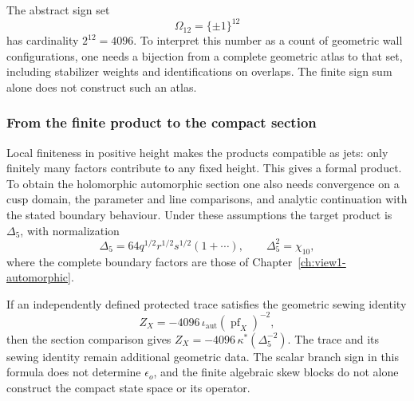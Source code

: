 The abstract sign set
\[
 \Omega_{12}=\{\pm1\}^{12}
\]
has cardinality \(2^{12}=4096\).  To interpret
this number as a count of geometric wall configurations, one needs
a bijection from a complete geometric atlas to that set, including
stabilizer weights and identifications on overlaps.  The finite
sign sum alone does not construct such an atlas.

\subsubsection*{From the finite product to the compact section}

Local finiteness in positive height makes the products compatible
as jets: only finitely many factors contribute to any fixed height.
This gives a formal product.  To obtain the holomorphic automorphic
section one also needs convergence on a cusp domain, the parameter
and line comparisons, and analytic continuation with the stated
boundary behaviour.  Under these assumptions the target product is
\(\Delta_5\), with normalization
\[
 \Delta_5=64q^{1/2}r^{1/2}s^{1/2}(1+\cdots),
 \qquad \Delta_5^2=\chi_{10},
\]
where the complete boundary factors are those of
Chapter~\ref{ch:view1-automorphic}.

If an independently defined protected trace satisfies the geometric
sewing identity
\[
 Z_X=-4096\,\iota_{\mathrm{aut}}(\operatorname{pf}_X)^{-2},
\]
then the section comparison gives
\(Z_X=-4096\,\kappa^*(\Delta_5^{-2})\).
The trace and its sewing identity remain additional geometric data.
The scalar branch sign in this formula does not determine
\(\epsilon_o\), and the finite algebraic skew blocks do not alone
construct the compact state space or its operator.
